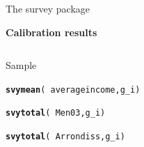 \documentclass[11pt,german,hideothersubsections]{beamer}\usepackage[]{graphicx}\usepackage[]{color}
\makeatletter
\newcommand{\hlopt}[1]{\textcolor[rgb]{0,0,0}{#1}}%
\newcommand{\hlstd}[1]{\textcolor[rgb]{0.345,0.345,0.345}{#1}}%
\newcommand{\hlkwd}[1]{\textcolor[rgb]{0.737,0.353,0.396}{\textbf{#1}}}%
\newenvironment{kframe}{%
 \def\at@end@of@kframe{}%
 \ifinner\ifhmode%
  \def\at@end@of@kframe{\end{minipage}}%
  \begin{minipage}{\columnwidth}%
 \fi\fi%
 \def\FrameCommand##1{\hskip\@totalleftmargin \hskip-\fboxsep
 \colorbox{shadecolor}{##1}\hskip-\fboxsep
     \hskip-\linewidth \hskip-\@totalleftmargin \hskip\columnwidth}%
 \MakeFramed {\advance\hsize-\width
   \@totalleftmargin\z@ \linewidth\hsize
   \@setminipage}}%
 {\par\unskip\endMakeFramed%
 \at@end@of@kframe}
\newenvironment{knitrout}{}{} %
\makeatother
\begin{document}
\begin{frame}[fragile]{The survey package}
\vspace{-.25cm}
\begin{center}
\textbf{Calibration results}
\end{center}
\footnotesize{
\vspace{.25cm}
\begin{columns}
\begin{column}{.5\textwidth}
\begin{block}{Sample}
\begin{knitrout}
\color{fgcolor}\begin{kframe}
\begin{alltt}
\hlkwd{svymean}\hlstd{(}\hlopt{~}\hlstd{averageincome,g_i)}
\end{alltt}


{\ttfamily\noindent\bfseries{}}\begin{alltt}
\hlkwd{svytotal}\hlstd{(}\hlopt{~}\hlstd{Men03,g_i)}
\end{alltt}


{\ttfamily\noindent\bfseries{}}\begin{alltt}
\hlkwd{svytotal}\hlstd{(}\hlopt{~}\hlstd{Arrondiss,g_i)}
\end{alltt}



\end{kframe}
\end{knitrout}
\end{block}
\end{column}
\end{columns}}
\end{frame}
\end{document}
